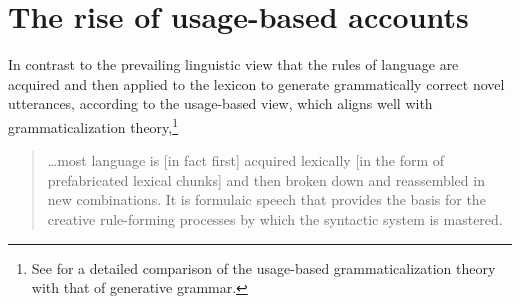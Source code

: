 \documentclass[english,output=paper,colorlinks,citecolor=brown]{../langscibook}
\begin{document}
\section{The rise of usage-based accounts}

In contrast to the prevailing linguistic view that the rules of language are acquired and then applied to the lexicon to generate grammatically correct novel utterances, according to the usage-based view, which aligns well with grammaticalization theory,\footnote{See \citet{Christy2010} for a detailed comparison of the usage-based grammaticalization theory with that of generative grammar.}

\begin{quote}
    …most language is [in fact first] acquired lexically [in the form of prefabricated lexical chunks] and then broken down and reassembled in new combinations. It is formulaic speech that provides the basis for the creative rule-forming processes by which the syntactic system is mastered. \citep[174]{MacKenzie2000Improvisation}
\end{quote}
\end{document}
